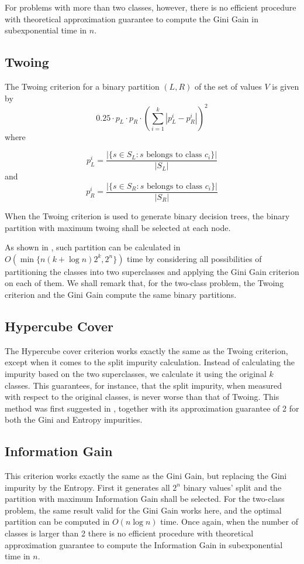 For problems with more than two classes, however, there is no efficient procedure with theoretical approximation guarantee to compute the Gini Gain in subexponential time in $n$.

\subsection{Twoing}
The Twoing criterion
for a  binary partition $(L,R)$ 
of the set of values $V$ is given by
$$ 0.25 \cdot p_L \cdot p_R  \cdot \left ( \sum_{i=1}^k | p_L^i - p_R^i | \right )^2$$
where

$$ p_L^i= \frac{|\{s \in S_L: s \mbox{ belongs to class } c_i \}|}{ |S_L|} $$
 and 
$$ p_R^i= \frac{|\{s \in S_R: s \mbox{ belongs to class } c_i\} |}{ |S_R|} $$

When the Twoing criterion is used to generate binary decision trees, the binary partition with maximum twoing shall be selected at each node. 

As shown in \cite{Breiman84}, such partition can be calculated in $O(\min \{ n (k + \log n) 2^k, 2^n \} )$
time by considering all possibilities of partitioning the classes into two superclasses
and applying the Gini Gain criterion on each of them. We shall remark that, for the two-class problem, the Twoing criterion and the Gini Gain compute the same binary partitions.


\subsection{Hypercube Cover}

The Hypercube cover criterion works exactly the same as the Twoing criterion, except when it comes to the split impurity calculation. Instead of calculating the impurity based on the two superclasses, we calculate it using the original $k$ classes. This guarantees, for instance, that the split impurity, when measured with respect to the original classes, is never worse than that of Twoing. This method was first suggested in \cite{icml2018}, together with its approximation guarantee of 2 for both the Gini and Entropy impurities.


\subsection{Information Gain}
This criterion works exactly the same as the Gini Gain, but replacing the Gini impurity by the Entropy. First it generates all $2^n$ binary values' split and the partition with maximum Information Gain shall be selected.
For the two-class problem, the same result valid for the Gini Gain works here, and the optimal partition  
can be computed in $O(n \log n)$ time. Once again, when the number of classes is larger than 2 there is no efficient procedure with theoretical approximation guarantee to compute the Information Gain in subexponential time in $n$.

